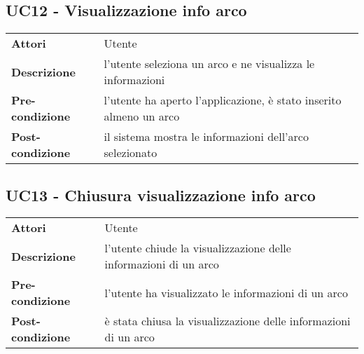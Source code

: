 \subsection{UC12 - Visualizzazione info arco}
\label{sssec:UC12}
\def\arraystretch{1.5}
\begin{tabularx}{\textwidth}{l|p{}}
\rowcolor{I} \multicolumn{2}{c}{\color{white}\textbf{UC12 - Visualizzazione info arco}} \\
\toprule
\endhead
\textbf{Attori} & Utente\\
\textbf{Descrizione} & l'utente seleziona un arco e ne visualizza le informazioni\\
\textbf{Pre-condizione} & l'utente ha aperto l'applicazione, è stato inserito almeno un arco\\
\textbf{Post-condizione} & il sistema mostra le informazioni dell'arco selezionato\\
\bottomrule
\end{tabularx}
\subsection{UC13 - Chiusura visualizzazione info arco}
\label{sssec:UC13}
\def\arraystretch{1.5}
\begin{tabularx}{\textwidth}{l|p{}}
\rowcolor{I} \multicolumn{2}{c}{\color{white}\textbf{UC13 - Chiusura visualizzazione info arco}} \\
\toprule
\endhead
\textbf{Attori} & Utente\\
\textbf{Descrizione} & l'utente chiude la visualizzazione delle informazioni di un arco\\
\textbf{Pre-condizione} & l'utente ha visualizzato le informazioni di un arco\\
\textbf{Post-condizione} & è stata chiusa la visualizzazione delle informazioni di un arco\\
\bottomrule
\end{tabularx}
